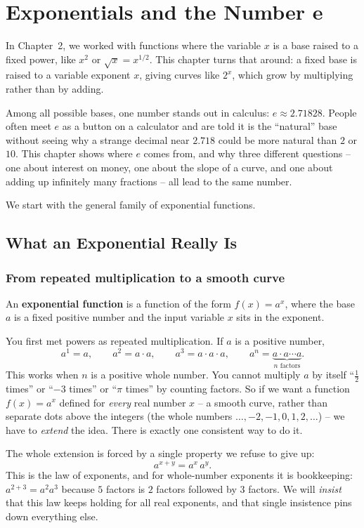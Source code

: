 \chapter{Exponentials and the Number e}

In Chapter~2, we worked with functions where the variable $x$ is a
base raised to a fixed power, like $x^2$ or $\sqrt{x}=x^{1/2}$. This chapter turns that
around: a fixed base is raised to a variable
exponent $x$, giving curves like $2^x$, which grow by multiplying rather than by adding.

Among all possible bases, one number stands out in calculus: $e \approx 2.71828$. People often meet $e$ as a button on a calculator and are told it is the ``natural'' base without seeing why a strange decimal near $2.718$ could be more natural than $2$ or $10$. This chapter shows where $e$ comes from, and why three different questions -- one about interest on money, one about the slope of a curve, and one about adding up infinitely many fractions -- all lead to the same number.

We start with the general family of exponential functions.

\section{What an Exponential Really Is}

\subsection{From repeated multiplication to a smooth curve}

An \textbf{exponential function} is a function of the form $f(x)=a^x$, where the base $a$ is a fixed positive number and the input variable $x$ sits in the exponent.

You first met powers as repeated multiplication. If $a$ is a positive number,
\[
a^1 = a, \qquad a^2 = a\cdot a, \qquad a^3 = a\cdot a\cdot a, \qquad a^n = \underbrace{a\cdot a\cdots a}_{n\text{ factors}}.
\]
This works when $n$ is a positive whole number. You cannot multiply $a$ by itself ``$\tfrac{1}{2}$ times'' or ``$-3$ times'' or ``$\pi$ times'' by counting factors. So if we want a function $f(x)=a^x$ defined for \emph{every} real number $x$ -- a smooth curve, rather than separate dots above the integers (the whole numbers $\ldots,-2,-1,0,1,2,\ldots$) -- we have to \emph{extend} the idea. There is exactly one consistent way to do it.

The whole extension is forced by a single property we refuse to give up:
\begin{equation}
a^{x+y} = a^x \, a^y. \label{ch03:law}
\end{equation}
This is the law of exponents, and for whole-number exponents it is bookkeeping: $a^{2+3}=a^2 a^3$ because $5$ factors is $2$ factors followed by $3$ factors. We will \emph{insist} that this law keeps holding for all real exponents, and that single insistence pins down everything else.

